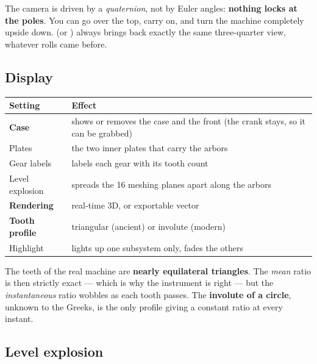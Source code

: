 \begin{astuce}
The camera is driven by a \emph{quaternion}, not by Euler angles: \textbf{nothing locks at the
poles}. You can go over the top, carry on, and turn the machine completely upside down.
 (or ) always brings back exactly the same three-quarter view, whatever
rolls came before.
\end{astuce}

\subsection{Display}

\begin{center}
\begin{tabularx}{\textwidth}{@{}lX@{}}
\toprule
\rowcolor{lightblue}\textbf{Setting} & \textbf{Effect} \\
\midrule
\textbf{Case} & shows or removes the case and the front (the crank stays, so it can be
grabbed) \\
Plates & the two inner plates that carry the arbors \\
Gear labels & labels each gear with its tooth count \\
Level explosion & spreads the 16 meshing planes apart along the arbors \\
\textbf{Rendering} & real-time 3D, or exportable vector \\
\textbf{Tooth profile} & triangular (ancient) or involute (modern) \\
Highlight & lights up one subsystem only, fades the others \\
\bottomrule
\end{tabularx}
\end{center}

\begin{info}
The teeth of the real machine are \textbf{nearly equilateral triangles}. The \emph{mean} ratio
is then strictly exact — which is why the instrument is right — but the \emph{instantaneous}
ratio wobbles as each tooth passes. The \textbf{involute of a circle}, unknown to the Greeks,
is the only profile giving a constant ratio at every instant.
\end{info}

\subsection{Level explosion}


